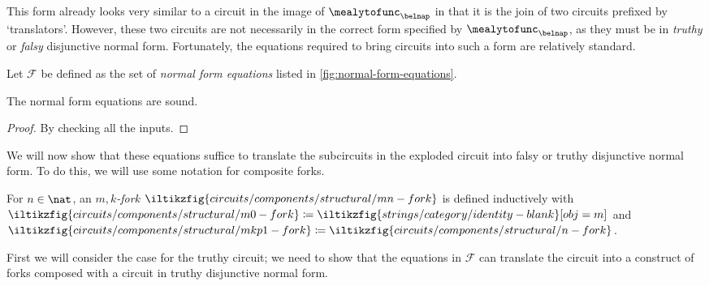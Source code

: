 This form already looks very similar to a circuit in the image of
\(\mealytofunc_\belnap\) in that it is the join of two circuits prefixed by
`translators'.
However, these two circuits are not necessarily in the correct form specified by
\(\mealytofunc_\belnap\), as they must be in \emph{truthy} or \emph{falsy}
disjunctive normal form.
Fortunately, the equations required to bring circuits into such a form are
relatively standard.

\begin{definition}
    Let \(\mathcal{F}\) be defined as the set of \emph{normal form equations}
    listed in \cref{fig:normal-form-equations}.
\end{definition}

\begin{lemma}
    The normal form equations are sound.
\end{lemma}
\begin{proof}
    By checking all the inputs.
\end{proof}



We will now show that these equations suffice to translate the subcircuits in
the exploded circuit into falsy or truthy disjunctive normal form.
To do this, we will use some notation for composite forks.

\begin{definition}\label{def:mk-fork}
    For \(n \in \nat\), an \emph{\(m,k\)-fork}
    \(\iltikzfig{circuits/components/structural/mn-fork}\)
    is defined
    inductively with \(
    \iltikzfig{circuits/components/structural/m0-fork} \coloneqq
    \iltikzfig{strings/category/identity-blank}[obj=m]
    \) and \(
    \iltikzfig{circuits/components/structural/mkp1-fork} \coloneqq
    \iltikzfig{circuits/components/structural/n-fork}
    \).
\end{definition}

First we will consider the case for the truthy circuit; we need to show that
the equations in \(\mathcal{F}\) can translate the circuit into a construct of
forks composed with a circuit in truthy disjunctive normal form.

